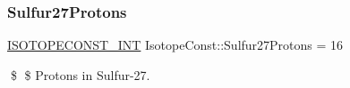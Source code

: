 \subsubsection{\texorpdfstring{Sulfur27\+Protons}{Sulfur27Protons}}
{\footnotesize\ttfamily \mbox{\hyperlink{group___isotope_const-_macros_ga5f18360b3e99483a35c32d789e62621c}{I\+S\+O\+T\+O\+P\+E\+C\+O\+N\+S\+T\+\_\+\+I\+NT}} Isotope\+Const\+::\+Sulfur27\+Protons = 16}

\$ \$ Protons in Sulfur-\/27. 